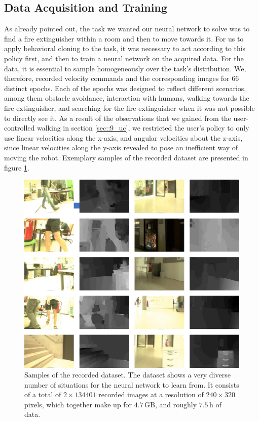 \subsection{Data Acquisition and Training}
\label{sec::423_da}
As already pointed out, the task we wanted our neural network to solve was to find a fire extinguisher within a room and then to move towards it. For us to apply behavioral cloning to the task, it was necessary to act according to this policy first, and then to train a neural network on the acquired data. For the data, it is essential to sample homogeneously over the task's distribution. We, therefore, recorded velocity commands and the corresponding images for 66 distinct epochs. Each of the epochs was designed to reflect different scenarios, among them obstacle avoidance, interaction with humans, walking towards the fire extinguisher, and searching for the fire extinguisher when it was not possible to directly see it. As a result of the observations that we gained from the user-controlled walking in section \ref{sec::9_uc}, we restricted the user's policy to only use linear velocities along the x-axis, and angular velocities about the z-axis, since linear velocities along the y-axis revealed to pose an inefficient way of moving the robot. Exemplary samples of the recorded dataset are presented in figure \ref{fig::423_dataset}.
\begin{figure}[h!]
	\centering
	\includegraphics[scale=.4]{chapters/11_autonomous_walking_experiments/img/dataset_diversity.png}
	\caption{Samples of the recorded dataset. The dataset shows a very diverse number of situations for the neural network to learn from. It consists of a total of $2\times134401$ recorded images at a resolution of $240\times320$ pixels, which together make up for $4.7\,\text{GB}$, and roughly $7.5\,\text{h}$ of data.}
	\label{fig::423_dataset}
\end{figure}
